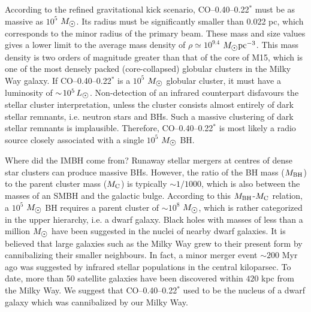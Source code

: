 \documentclass{nature}
\def\sun{\hbox{$\odot$}}
\begin{document}
According to the refined gravitational kick scenario, CO--0.40--0.22$^*$ must be as massive as $10^5$ $M_{\sun}$. Its radius must be significantly smaller than 0.022 pc, which corresponds to the minor radius of the primary beam. These mass and size values gives a lower limit to the average mass density of $\rho\!\simeq\! 10^{9.4}$ $M_{\sun} \mbox{pc}^{-3}$. This mass density is two orders of magnitude greater than that of the core of M15, which is one of the most densely packed (core-collapsed) globular clusters in the Milky Way galaxy\cite{Djorgovski84}. If CO--0.40--0.22$^*$ is a $10^5$ $M_{\sun}$ globular cluster, it must have a luminosity of $\sim\!10^5\,L_{\sun}$\cite{McLaughlin2000}. Non-detection of an infrared counterpart disfavours the stellar cluster interpretation, unless the cluster consists almost entirely of dark stellar remnants, i.e. neutron stars and BHs. Such a massive clustering of dark stellar remnants is implausible. Therefore, CO--0.40--0.22$^*$ is most likely a radio source closely associated with a single $10^5$ $M_{\sun}$ BH.

Where did the IMBH come from? Runaway stellar mergers at centres of dense star clusters can produce massive BHs. However, the ratio of the BH mass ($M_{\rm BH}$) to the parent cluster mass ($M_{\rm C}$) is typically $\sim\!1/1000$\cite{Marchant80, Portegies99}, which is also between the masses of an SMBH and the galactic bulge\cite{Marconi03}. According to this $M_{\rm BH}$-$M_{\rm C}$ relation, a $10^5$ $M_{\sun}$ BH requires a parent cluster of $\sim\!10^8$ $M_{\sun}$, which is rather categorized in the upper hierarchy, i.e. a dwarf galaxy. Black holes with masses of less than a million $M_{\sun}$ have been suggested in the nuclei of nearby dwarf galaxies\cite{Moran14}. It is believed that large galaxies such as the Milky Way grew to their present form by cannibalizing their smaller neighbours. In fact, a minor merger event $\sim\!200$ Myr ago was suggested by infrared stellar populations in the central kiloparsec\cite{vanLoon03}. To date, more than 50 satellite galaxies have been discovered within $420$ kpc from the Milky Way. We suggest that CO--0.40--0.22$^*$ used to be the nucleus of a dwarf galaxy which was cannibalized by our Milky Way.
\end{document}
